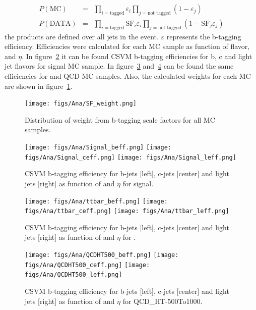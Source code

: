 \begin{eqnarray}
  \label{eq:DataMCSFP}
  P(\text{MC}) & = & \prod_{i=\text{tagged}} \varepsilon_i \prod_{j=\text{not tagged}} (1-\varepsilon_j) \\
  P(\text{DATA}) & = & \prod_{i=\text{tagged}} \text{SF}_i \varepsilon_i \prod_{j=\text{not tagged}} (1-\text{SF}_j \varepsilon_j)
\end{eqnarray}the products are defined over all jets in the event. $\varepsilon$ represents the b-tagging efficiency. Efficiencies were calculated for each MC sample as function of flavor, \pt and $\eta$. In figure~\ref{fig:SignalBEff} it can be found CSVM b-tagging efficiencies for b, c and light jet flavors for signal MC sample. In figure~\ref{fig:ttbarBEff} and~\ref{fig:QCDBEff} can be found the same efficiencies for \ttbar and QCD MC samples. Also, the calculated weights for each MC are shown in figure~\ref{fig:SFweight}. 

\begin{figure}[!Hhtbp]
  \begin{center}
    \texttt{[image: figs/Ana/SF\_weight.png]}
    \caption{Distribution of weight from b-tagging scale factors for all MC samples.}
    \label{fig:SFweight}
  \end{center}
\end{figure}

\begin{figure}[!Hhtbp]
  \begin{center}
    \texttt{[image: figs/Ana/Signal\_beff.png]}
    \texttt{[image: figs/Ana/Signal\_ceff.png]}
    \texttt{[image: figs/Ana/Signal\_leff.png]}
    \caption{CSVM b-tagging efficiency for b-jets [left], c-jets [center] and light jets [right] as function of \pt and $\eta$ for signal.}
    \label{fig:SignalBEff}
  \end{center}
\end{figure}

\begin{figure}[!Hhtbp]
  \begin{center}
    \texttt{[image: figs/Ana/ttbar\_beff.png]}
    \texttt{[image: figs/Ana/ttbar\_ceff.png]}
    \texttt{[image: figs/Ana/ttbar\_leff.png]}
    \caption{CSVM b-tagging efficiency for b-jets [left], c-jets [center] and light jets [right] as function of \pt and $\eta$ for \ttbar.}
    \label{fig:ttbarBEff}
  \end{center}
\end{figure}

\begin{figure}[!Hhtbp]
  \begin{center}
    \texttt{[image: figs/Ana/QCDHT500\_beff.png]}
    \texttt{[image: figs/Ana/QCDHT500\_ceff.png]}
    \texttt{[image: figs/Ana/QCDHT500\_leff.png]}
    \caption{CSVM b-tagging efficiency for b-jets [left], c-jets [center] and light jets [right] as function of \pt and $\eta$ for QCD\_HT-500To1000.}
    \label{fig:QCDBEff}
  \end{center}
\end{figure}

